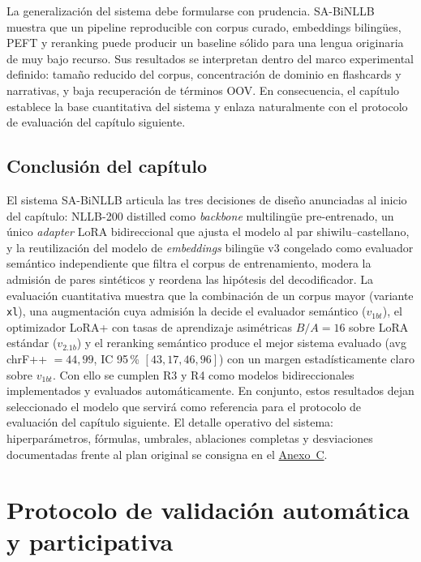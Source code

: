 \documentclass[12pt,a4paper,oneside]{book}
\begin{document}
La generalización del sistema debe formularse con prudencia. SA-BiNLLB muestra que un pipeline reproducible con corpus curado, embeddings bilingües, PEFT y reranking puede producir un baseline sólido para una lengua originaria de muy bajo recurso. Sus resultados se interpretan dentro del marco experimental definido: tamaño reducido del corpus, concentración de dominio en flashcards y narrativas, y baja recuperación de términos OOV. En consecuencia, el capítulo establece la base cuantitativa del sistema y enlaza naturalmente con el protocolo de evaluación del capítulo siguiente.

\section{Conclusión del capítulo}\label{nmt-conclusion-capitulo}

El sistema SA-BiNLLB articula las tres decisiones de diseño anunciadas al inicio del capítulo: NLLB-200 distilled como \emph{backbone} multilingüe pre-entrenado, un único \emph{adapter} LoRA bidireccional que ajusta el modelo al par shiwilu--castellano, y la reutilización del modelo de \emph{embeddings} bilingüe v3 congelado como evaluador semántico independiente que filtra el corpus de entrenamiento, modera la admisión de pares sintéticos y reordena las hipótesis del decodificador. La evaluación cuantitativa muestra que la combinación de un corpus mayor (variante \texttt{xl}), una augmentación cuya admisión la decide el evaluador semántico (\(v_{1bt}\)), el optimizador LoRA+ con tasas de aprendizaje asimétricas \(B/A=16\) sobre LoRA estándar (\(v_{2.1b}\)) y el reranking semántico produce el mejor sistema evaluado (avg chrF++ \(=44{,}99\), IC 95\,\% \([43{,}17, 46{,}96]\)) con un margen estadísticamente claro sobre \(v_{1bt}\). Con ello se cumplen R3 y R4 como modelos bidireccionales implementados y evaluados automáticamente. En conjunto, estos resultados dejan seleccionado el modelo que servirá como referencia para el protocolo de evaluación del capítulo siguiente. El detalle operativo del sistema: hiperparámetros, fórmulas, umbrales, ablaciones completas y desviaciones documentadas frente al plan original se consigna en el \hyperref[anexo-nmt-reproducible]{Anexo~C}.

\chapter{Protocolo de validación automática y participativa}\label{protocolo-validacion-automatica-participativa}
\end{document}
